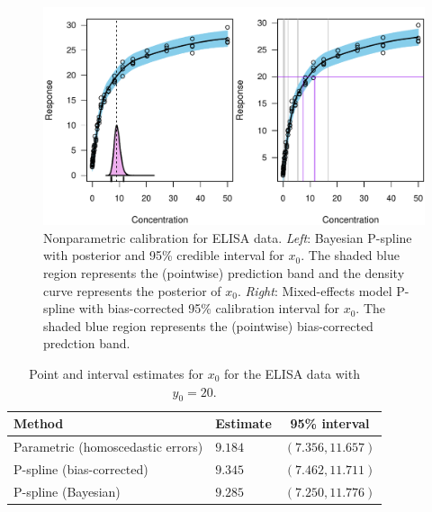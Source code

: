 \documentclass[cmfont,usenames,dvipsnames,leqno]{afit-etd}\usepackage[]{graphicx}\usepackage[]{color}
\makeatletter
\def\maxwidth{ %
  \ifdim\Gin@nat@width>\linewidth
    \linewidth
  \else
    \Gin@nat@width
  \fi
}
\newenvironment{knitrout}{}{} %
\renewenvironment{knitrout}{\begin{singlespace}}{\end{singlespace}}
\makeatother
\begin{document}
\begin{knitrout}
\color{fgcolor}\begin{figure}[H]

\includegraphics[width=\maxwidth]{figure/elisa-jags} \caption[Bayesian nonparametric calibration for ELISA data]{Nonparametric calibration for ELISA data. \textit{Left}: Bayesian P-spline with posterior and 95\% credible interval for $x_0$. The shaded blue region represents the (pointwise) prediction band and the density curve represents the posterior of $x_0$. \textit{Right}: Mixed-effects model P-spline with bias-corrected 95\% calibration interval for $x_0$. The shaded blue region represents the (pointwise) bias-corrected predction band.\label{fig:elisa-jags}}
\end{figure}


\end{knitrout}


\begin{table}[H]
\label{tab:elisa}
\centering
\begin{tabular}{llc}
  \toprule
  \textbf{Method} & \textbf{Estimate} & \textbf{95\% interval} \\
  \midrule
  Parametric (homoscedastic errors)   & $9.184$ & $(7.356, 11.657)$ \\
  P-spline (bias-corrected)            & $9.345$ & $(7.462, 11.711)$ \\
  P-spline (Bayesian)                 & $9.285$ & $(7.250, 11.776)$ \\
  \bottomrule
\end{tabular}
\caption[Calibration results for the ELISA data]{Point and interval estimates for $x_0$ for the ELISA data with $y_0 = 20$.}
\end{table}
\end{document}
